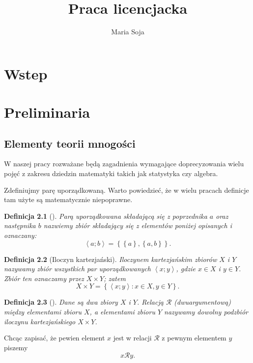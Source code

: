 \documentclass[12pt,a4paper]{report}
\author{Maria Soja}
\title{Praca licencjacka}
\newtheorem{definition}{Definicja}[chapter]
\newcommand{\parauporzadkowana}[2]{\left\langle {#1}; {#2} \right\rangle}
\newcommand{\zbior}[1]{\left\lbrace {#1} \right\rbrace }
\begin{document}
\maketitle
\tableofcontents

\chapter{Wstep}

\chapter{Preliminaria}

\section{Elementy teorii mnogości}
W naszej pracy rozważane będą zagadnienia wymagające doprecyzowania wielu pojęć z zakresu dziedzin matematyki takich jak statystyka czy algebra. 


Zdefiniujmy parę uporządkowaną. Warto powiedzieć, że w wielu pracach definicje tam użyte są matematycznie niepoprawne.

\begin{definition}[\citep{kuratowski1966wstkep}]
Parą uporządkowana składającą się z poprzednika $a$ oraz następnika $b$ nazwiemy zbiór składający się z elementów poniżej opisanych i oznaczany:
\begin{equation*}
\parauporzadkowana{a}{b}=\zbior{\zbior{a}, \zbior{a,b}}.
\end{equation*}

\end{definition}

\begin{definition}[Iloczyn kartezjański\citep{kuratowski1966wstkep}]
Iloczynem kartezjańskim zbiorów $X$ i $Y$ nazywamy zbiór wszystkich par uporządkowanych $\parauporzadkowana{x}{y}$, gdzie $x \in X$ i $y \in Y$. Zbiór ten oznaczamy przez $ X \times Y$; zatem
\begin{equation*}
X \times Y= \zbior{\parauporzadkowana{x}{y}:  x\in X  , y \in Y}.
\end{equation*} 

\end{definition}

\begin{definition}[\citep{kraszewski2007wstkep}]
Dane są dwa zbiory $X$ i $Y$. Relacją $\mathcal{R}$ (dwuargumentową) między elementami zbioru $X$, a elementami zbioru $Y$ nazywamy dowolny podzbiór iloczynu kartezjańskiego $X \times Y$.
\end{definition}
Chcąc zapisać, że pewien element $x$ jest w relacji $\mathcal{R}$ z pewnym elementem $y$ piszemy
$$
x\mathcal{R}y.
$$
\end{document}
